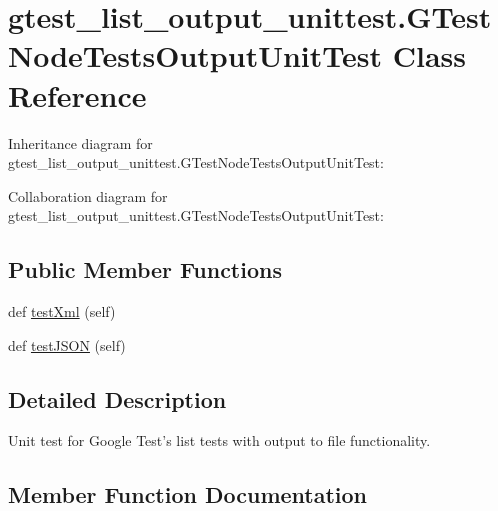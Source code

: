 \hypertarget{classgtest__list__output__unittest_1_1GTestListTestsOutputUnitTest}{}\section{gtest\+\_\+list\+\_\+output\+\_\+unittest.\+G\+Test\+Node\+Tests\+Output\+Unit\+Test Class Reference}
\label{classgtest__list__output__unittest_1_1GTestListTestsOutputUnitTest}


Inheritance diagram for gtest\+\_\+list\+\_\+output\+\_\+unittest.\+G\+Test\+Node\+Tests\+Output\+Unit\+Test\+:


Collaboration diagram for gtest\+\_\+list\+\_\+output\+\_\+unittest.\+G\+Test\+Node\+Tests\+Output\+Unit\+Test\+:
\subsection*{Public Member Functions}
\begin{DoxyCompactItemize}
\item 
def \hyperlink{classgtest__list__output__unittest_1_1GTestListTestsOutputUnitTest_ad3088bc8ee3a0abdabbf1b90507e272e}{test\+Xml} (self)
\item 
def \hyperlink{classgtest__list__output__unittest_1_1GTestListTestsOutputUnitTest_a99bc0627a969b4c7b63ed91e8f187637}{test\+J\+S\+ON} (self)
\end{DoxyCompactItemize}


\subsection{Detailed Description}
\begin{DoxyVerb}Unit test for Google Test's list tests with output to file functionality.
\end{DoxyVerb}
 

\subsection{Member Function Documentation}
\mbox{\label{classgtest__list__output__unittest_1_1GTestListTestsOutputUnitTest_a99bc0627a969b4c7b63ed91e8f187637}} 
